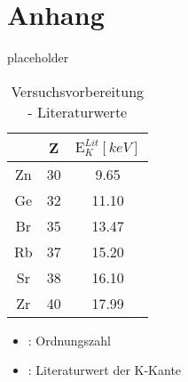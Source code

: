 \section{Anhang}
placeholder



\begin{table}
    \begin{minipage}{.5\textwidth} 
        \caption{Versuchsvorbereitung - Literaturwerte \cite{Steffen}}
        \centering
        \begin{tabular}{c c c}
            \toprule
                \mbox{} & Z & $\text{E}_K^{Lit} [\si{keV}]$  \\ %
            \midrule
                Zn & 30 & 9.65   \\
                Ge & 32 & 11.10  \\
                Br & 35 & 13.47  \\
                Rb & 37 & 15.20  \\
                Sr & 38 & 16.10  \\
                Zr & 40 & 17.99 \\
            \bottomrule    
        \end{tabular}
    \end{minipage}
\begin{minipage}{.5\textwidth}
    \begin{itemize}
    \item[]{: Ordnungszahl}
    \item[]{: Literaturwert der K-Kante}
    \end{itemize}
\end{minipage}
\end{table}
